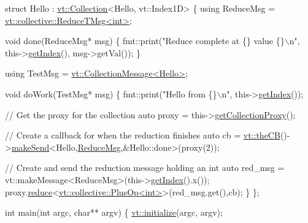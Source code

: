 \begin{DoxyCodeInclude}
\textcolor{keyword}{struct }Hello : \hyperlink{structvt_1_1vrt_1_1collection_1_1_collection}{vt::Collection}<Hello, vt::Index1D> \{
  \textcolor{keyword}{using} ReduceMsg = \hyperlink{structvt_1_1collective_1_1reduce_1_1operators_1_1_reduce_t_msg}{vt::collective::ReduceTMsg<int>};

  \textcolor{keywordtype}{void} done(ReduceMsg* msg) \{
    fmt::print(\textcolor{stringliteral}{"Reduce complete at \{\} value \{\}\(\backslash\)n"}, this->\hyperlink{structvt_1_1vrt_1_1collection_1_1_indexable_a28d05f23e7a20e12e94b8235305c1e82}{getIndex}(), msg->getVal());
  \}

  \textcolor{keyword}{using} TestMsg = \hyperlink{structvt_1_1vrt_1_1collection_1_1_collection_message}{vt::CollectionMessage<Hello>};

  \textcolor{keywordtype}{void} doWork(TestMsg* msg) \{
    fmt::print(\textcolor{stringliteral}{"Hello from \{\}\(\backslash\)n"}, this->\hyperlink{structvt_1_1vrt_1_1collection_1_1_indexable_a28d05f23e7a20e12e94b8235305c1e82}{getIndex}());

    \textcolor{comment}{// Get the proxy for the collection}
    \textcolor{keyword}{auto} proxy = this->\hyperlink{structvt_1_1vrt_1_1collection_1_1_collection_base_ad97d9ab1a28fb535c5d7f82c15e99791}{getCollectionProxy}();

    \textcolor{comment}{// Create a callback for when the reduction finishes}
    \textcolor{keyword}{auto} cb = \hyperlink{namespacevt_a673b109e94c7bca58313504c83e1da94}{vt::theCB}()->\hyperlink{structvt_1_1pipe_1_1_pipe_manager_a73583be6260418b13ee66e56cdade2da}{makeSend}<Hello,\hyperlink{namespacevt_1_1collective_a4c5bf7769ad4396573d6bcc85ec430a4}{ReduceMsg},&Hello::done>(proxy(2));

    \textcolor{comment}{// Create and send the reduction message holding an int}
    \textcolor{keyword}{auto} red\_msg = vt::makeMessage<ReduceMsg>(this->\hyperlink{structvt_1_1vrt_1_1collection_1_1_indexable_a28d05f23e7a20e12e94b8235305c1e82}{getIndex}().x());
    proxy.\hyperlink{structvt_1_1objgroup_1_1proxy_1_1_proxy_a61273d407174fb496b4aed10ec6650bd}{reduce}<\hyperlink{structvt_1_1collective_1_1reduce_1_1operators_1_1_plus_op}{vt::collective::PlusOp<int>}>(red\_msg.get(),cb);
  \}
\};

\textcolor{keywordtype}{int} main(\textcolor{keywordtype}{int} argc, \textcolor{keywordtype}{char}** argv) \{
  \hyperlink{namespacevt_aae6ab5af3e11886ce73c4c3ffa008201}{vt::initialize}(argc, argv);


\end{DoxyCodeInclude}
